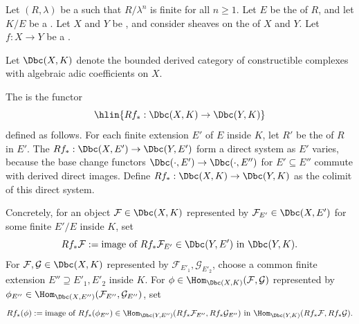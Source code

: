 \begin{definition} \label{definition:derived_direct_image_functor_on_bounded_constructible_complexes_with_algebraic_coefficients_on_a_noetherian_scheme}
Let $(R, \lambda)$ be a   such that $R/\lambda^n$ is finite for all $n \geq 1$. Let $E$ be the  of $R$, and let $K/E$ be a . Let $X$ and $Y$ be , and consider sheaves on the  of $X$ and $Y$. Let $f: X \to Y$ be a .

Let $\Dbc(X, K)$ denote the bounded derived category of constructible complexes with algebraic adic coefficients on $X$.

The  is the functor
$$\hlin{Rf_* : \Dbc(X, K) \to \Dbc(Y, K)}$$
defined as follows. For each finite extension $E'$ of $E$ inside $K$, let $R'$ be the  of $R$ in $E'$. The  $Rf_*: \Dbc(X, E') \to \Dbc(Y, E')$ form a direct system as $E'$ varies, because the base change functors $\Dbc(\cdot, E') \to \Dbc(\cdot, E'')$ for $E' \subseteq E''$ commute with derived direct images. Define $Rf_*: \Dbc(X, K) \to \Dbc(Y, K)$ as the colimit of this direct system.

Concretely, for an object $\mathcal{F} \in \Dbc(X, K)$ represented by $\mathcal{F}_{E'} \in \Dbc(X, E')$ for some finite $E'/E$ inside $K$, set
$$Rf_* \mathcal{F} := \text{image of } Rf_* \mathcal{F}_{E'} \in \Dbc(Y, E') \text{ in } \Dbc(Y, K).$$
For $\mathcal{F}, \mathcal{G} \in \Dbc(X, K)$ represented by $\mathcal{F}_{E'_1}, \mathcal{G}_{E'_2}$, choose a common finite extension $E'' \supseteq E'_1, E'_2$ inside $K$. For $\phi \in \Hom_{\Dbc(X, K)}(\mathcal{F}, \mathcal{G})$ represented by $\phi_{E''} \in \Hom_{\Dbc(X, E'')}(\mathcal{F}_{E''}, \mathcal{G}_{E''})$, set
$$Rf_* (\phi) := \text{image of } Rf_*(\phi_{E''}) \in \Hom_{\Dbc(Y, E'')}(Rf_* \mathcal{F}_{E''}, Rf_* \mathcal{G}_{E''}) \text{ in } \Hom_{\Dbc(Y, K)}(Rf_* \mathcal{F}, Rf_* \mathcal{G}).$$
\end{definition}